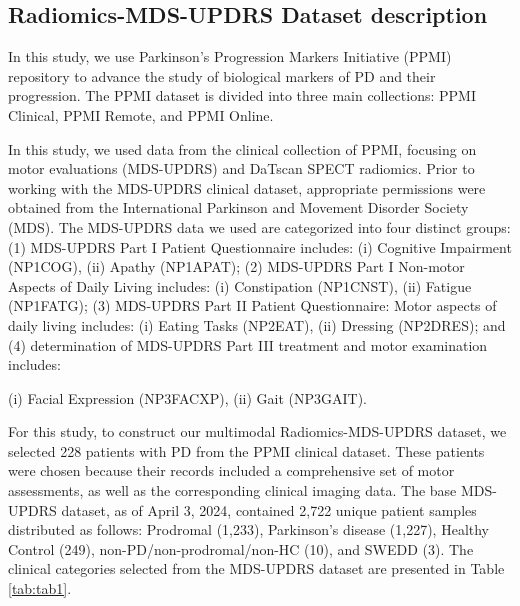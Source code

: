 \documentclass{article}
\begin{document}



\subsection{Radiomics-MDS-UPDRS Dataset description}

In this study, we use Parkinson's Progression Markers Initiative (PPMI) \cite{marek2011parkinson} repository to advance the study of biological markers of PD and their progression. The PPMI dataset is divided into three main collections: PPMI Clinical, PPMI Remote, and PPMI Online. 

In this study, we used data from the clinical collection of PPMI, focusing on motor evaluations (MDS-UPDRS) and DaTscan SPECT radiomics. Prior to working with the MDS-UPDRS clinical dataset, appropriate permissions were obtained from the International Parkinson and Movement Disorder Society (MDS). The MDS-UPDRS data we used are categorized into four distinct groups: (1) MDS-UPDRS Part I Patient Questionnaire includes: (i) Cognitive Impairment (NP1COG), (ii) Apathy (NP1APAT); (2) MDS-UPDRS Part I Non-motor Aspects of Daily Living includes: (i) Constipation (NP1CNST), (ii) Fatigue (NP1FATG); (3) MDS-UPDRS Part II Patient Questionnaire: Motor aspects of daily living includes: (i) Eating Tasks (NP2EAT), (ii) Dressing (NP2DRES); and (4) determination of MDS-UPDRS Part III treatment and motor examination includes:

(i) Facial Expression  (NP3FACXP), (ii) Gait (NP3GAIT). 

For this study, to construct our multimodal Radiomics-MDS-UPDRS dataset, we selected 228 patients with PD from the PPMI clinical dataset. These patients were chosen because their records included a comprehensive set of motor assessments, as well as the corresponding clinical imaging data. The base MDS-UPDRS dataset, as of April 3, 2024, contained 2,722 unique patient samples distributed as follows: Prodromal (1,233), Parkinson's disease (1,227), Healthy Control (249), non-PD/non-prodromal/non-HC (10), and SWEDD (3). The clinical categories selected from the MDS-UPDRS dataset are presented in Table \ref{tab:tab1}.
\end{document}
